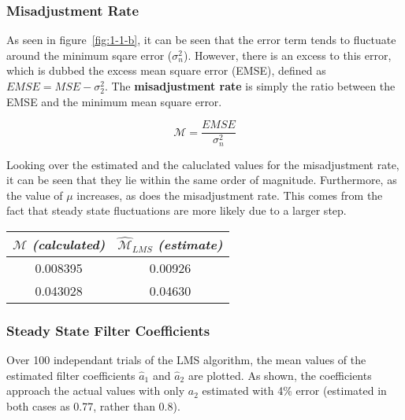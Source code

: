 \documentclass[main.tex]{subfiles}
\begin{document}
\subsubsection{Misadjustment Rate}


As seen in figure~\ref{fig:1-1-b}, it can be seen that the error term tends to fluctuate around the minimum sqare error ($\sigma_n^2$). However, there is an excess to this error, which is dubbed the excess mean square error (EMSE), defined as $EMSE = MSE - \sigma_2^2$. The \textbf{misadjustment rate} is simply the ratio between the EMSE and the minimum mean square error.

\begin{equation}
\mathcal{M} = \frac{EMSE}{\sigma_n^2}
\end{equation}

Looking over the estimated and the caluclated values for the misadjustment rate, it can be seen that they lie within the same order of magnitude. Furthermore, as the value of $\mu$ increases, as does the misadjustment rate. This comes from the fact that steady state fluctuations are more likely due to a larger step.

\begin{table}[h]
	\centering
	\begin{tabular}{ | c |  c | }
		\hline
		$\mathcal{M}$ \textit{(calculated)} & $\hat{\mathcal{M}}_{LMS}$ \textit{(estimate)} \\ \hline
		0.008395      & 0.00926                   \\ \hline
		0.043028      & 0.04630                  \\ \hline
	\end{tabular}
\end{table}










\subsubsection{Steady State Filter Coefficients}

Over 100 independant trials of the LMS algorithm, the mean values of the estimated filter coefficients $\hat{a}_1$ and $\hat{a}_2$ are plotted. As shown, the coefficients approach the actual values with only $a_2$ estimated with 4\% error (estimated in both cases as 0.77, rather than 0.8).
\end{document}

